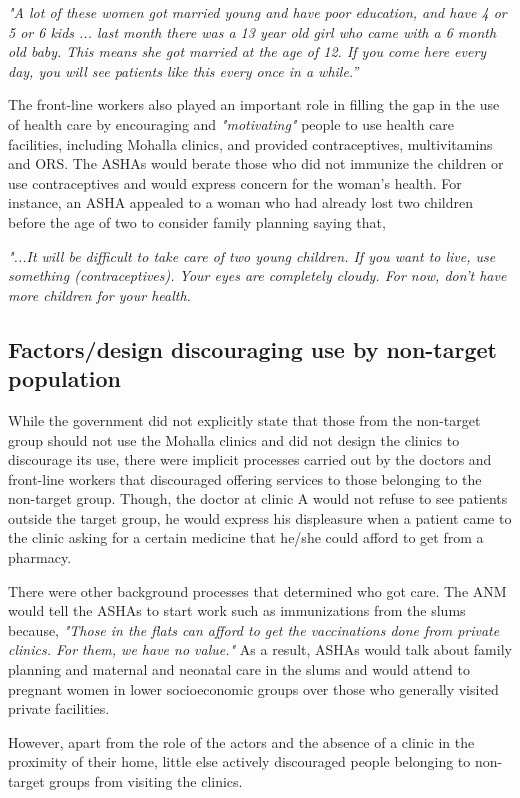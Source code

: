 \textit{"A lot of these women got married young and have poor education, and have 4 or 5 or 6 kids ... last month there was a 13 year old girl who came with a 6 month old baby. This means she got married at the age of 12. If you come here every day, you will see patients like this every once in a while.”}

The front-line workers also played an important role in filling the gap in the use of health care by encouraging and \textit{"motivating"} people to use health care facilities, including Mohalla clinics, and provided contraceptives, multivitamins and ORS. The ASHAs would berate those who did not immunize the children or use contraceptives and would express concern for the woman's health. For instance, an ASHA appealed to a woman who had already lost two children before the age of two to consider family planning saying that, 

\textit{"...It will be difficult to take care of two young children. If you want to live, use something (contraceptives). Your eyes are completely cloudy. For now, don’t have more children for your health.}

\subsection{Factors/design discouraging use by non-target population}
While the government did not explicitly state that those from the non-target group should not use the Mohalla clinics and did not design the clinics to discourage its use, there were implicit processes carried out by the doctors and front-line workers that discouraged offering services to those belonging to the non-target group. Though, the doctor at clinic A would not refuse to see patients outside the target group, he would express his displeasure when a patient came to the clinic asking for a certain medicine that he/she could afford to get from a pharmacy.

There were other background processes that determined who got care. The ANM would tell the ASHAs to start work such as immunizations from the slums because, \textit{"Those in the flats can afford to get the vaccinations done from private clinics. For them, we have no value."} As a result, ASHAs would talk about family planning and maternal and neonatal care in the slums and would attend to pregnant women in lower socioeconomic groups over those who generally visited private facilities. %

However, apart from the role of the actors and the absence of a clinic in the proximity of their home, little else actively discouraged people belonging to non-target groups from visiting the clinics.